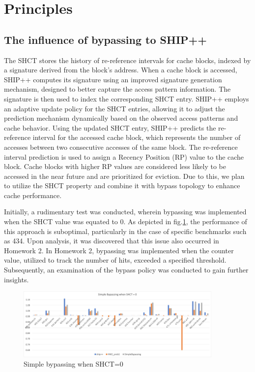 
\section{Principles}
\subsection{The influence of bypassing to SHIP++}
The SHCT stores the history of re-reference intervals for cache blocks, indexed by a signature derived from the block's address. When a cache block is accessed, SHIP++ computes its signature using an improved signature generation mechanism, designed to better capture the access pattern information. The signature is then used to index the corresponding SHCT entry. SHIP++ employs an adaptive update policy for the SHCT entries, allowing it to adjust the prediction mechanism dynamically based on the observed access patterns and cache behavior. Using the updated SHCT entry, SHIP++ predicts the re-reference interval for the accessed cache block, which represents the number of accesses between two consecutive accesses of the same block. The re-reference interval prediction is used to assign a Recency Position (RP) value to the cache block. Cache blocks with higher RP values are considered less likely to be accessed in the near future and are prioritized for eviction\cite{Wu2011}. Due to this, we plan to utilize the SHCT property and combine it with bypass topology to enhance cache performance.\par
Initially, a rudimentary test was conducted, wherein bypassing was implemented when the SHCT value was equated to 0. As depicted in fig.\ref{fig.Picture4}, the performance of this approach is suboptimal, particularly in the case of specific benchmarks such as 434. Upon analysis, it was discovered that this issue also occurred in Homework 2. In Homework 2, bypassing was implemented when the counter value, utilized to track the number of hits, exceeded a specified threshold. Subsequently, an examination of the bypass policy was conducted to gain further insights.\par
\begin{figure}[htbp]
\centering
\includegraphics[width=0.9\textwidth]{figs/Picture4.png}
\caption{Simple bypassing when SHCT=0}
\label{fig.Picture4}
\end{figure}
